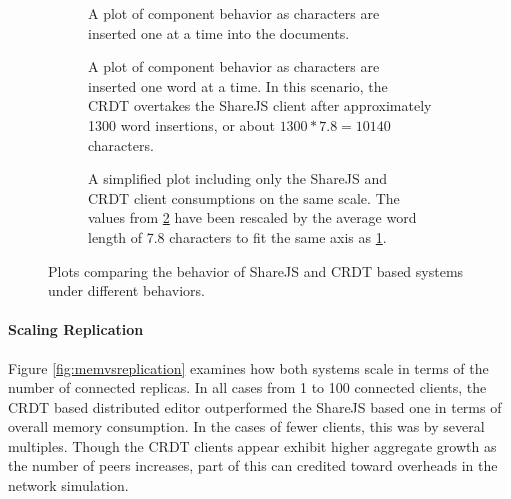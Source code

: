 \documentclass[12pt,a4paper,twoside,openright]{report}
\begin{document}
				
				\begin{figure} [H]
				\centering
				\begin{subfigure}[t]{.45\textwidth}
				  \centering
				  
				  \caption[Single Client Memory Consumption with Character Insertion] {A plot of component behavior as characters are inserted one at a time into the documents.}
				  \label{fig:sub1}
				\end{subfigure}%
				\begin{subfigure}[t]{.45\textwidth}
				  \centering
				  
				  \caption{A plot of component behavior as characters are inserted one word at a time. In this scenario, the CRDT overtakes the ShareJS client after approximately 1300 word insertions, or about $1300*7.8 = 10140$ characters.}
				  \label{fig:sub2}
				\end{subfigure}
				\begin{subfigure}[t]{0.6\textwidth}
				  \centering
			  	  
				  \caption{A simplified plot including only the ShareJS and CRDT client consumptions on the same scale. The values from \ref{fig:sub2} have been rescaled by the average word length of 7.8 characters to fit the same axis as \ref{fig:sub1}.}
				  \label{fig:sub3}
				\end{subfigure}
				\caption[Single Client Memory Consumption]{Plots comparing the behavior of ShareJS and CRDT based systems under different behaviors.}
				\label{fig:singleclientmemory}
				\end{figure}
				
				
				
			\paragraph{Scaling Replication}
				Figure \ref{fig:memvsreplication} examines how both systems scale in terms of the number of connected replicas. In all cases from 1 to 100 connected clients, the CRDT based distributed editor outperformed the ShareJS based one in terms of overall memory consumption. In the cases of fewer clients, this was by several multiples. Though the CRDT clients appear exhibit higher aggregate growth as the number of peers increases, part of this can credited toward overheads in the network simulation.
			
\end{document}
